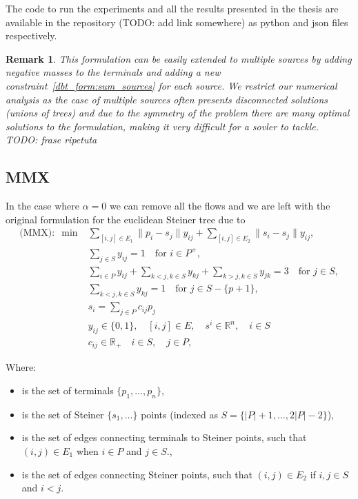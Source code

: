 \documentclass[12pt,a4paper]{article}
\newenvironment{itemizeb}
{\begin{itemize}
     \itemsep=2pt}{
\end{itemize}}
\numberwithin{equation}{section}
\theoremstyle{mytheorem}
\theoremstyle{myremark}
\newtheorem{remark}[subsection]{Remark}
\theoremstyle{myparagraph}
\newcommand{\R}{\mathbb{R}}
\begin{document}
    The code to run the experiments and all the results presented in the thesis are available in the repository (TODO: add link somewhere) as python and json files respectively. 

    \begin{remark}
        This formulation can be easily extended to multiple sources by adding negative masses to the terminals and adding a new
        constraint~\ref{dbt_form:sum_sources} for each source.
        We restrict our numerical analysis as the case of multiple sources often presents disconnected solutions (unions of trees)
        and due to the symmetry of the problem there are many optimal solutions to the formulation, making it very difficult for a sovler to
        tackle. TODO: frase ripetuta
    \end{remark}

    \subsection{MMX}
    \label{sec:MMX}
    In the case where $\alpha=0$ we can remove all the flows and we are left with the original formulation for the euclidean
    Steiner tree due to~\cite[Section 2]{mmx}
    \begin{align}
        \text{(MMX)}: \; \min &\sum_{[i,j] \in E_1} \|p_i - s_j\| y_{ij} + \sum_{[i,j] \in E_2} \|s_i - s_j\| y_{ij}, \\
        & \sum_{j \in S} y_{ij} = 1 \quad \text{for } i \in P^+, \\
        & \sum_{i \in P} y_{ij} + \sum_{k < j, k \in S} y_{kj} + \sum_{k > j, k \in S} y_{jk} = 3 \quad \text{for } j \in S, \label{MMX:connectivity_steiner} \\
        & \sum_{k < j, k \in S} y_{kj} = 1 \quad \text{for } j \in S - \{p+1\},  \\
        & s_i = \sum_{j \in P} c_{ij} p_j \\
        & y_{ij} \in \{0, 1\}, \quad [i, j] \in E, \quad s^i \in \mathbb{R}^n, \quad i \in S \\
        & c_{ij} \in \R_+ \quad i \in S, \quad j \in P,
    \end{align}

    Where:
    \begin{itemizeb}
         cm=.3 cm
        \item [$P$] is the set of terminals $\{p_1, \ldots, p_n\}$,
        \item [$S$] is the set of Steiner $\{s_1, \ldots\}$ points (indexed as $S = \{|P| + 1, \dots, 2|P|-2\}$),
        \item [$E_1$] is the set of edges connecting terminals to Steiner points, such that $(i,j) \in E_1$ when $i \in P$ and $j \in S$.,
        \item [$E_2$] is the set of edges connecting Steiner points, such that $(i,j) \in E_2$ if $i,j \in S$ and $i < j$.
    \end{itemizeb}
\end{document}

